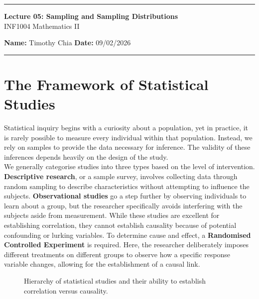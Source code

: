 \documentclass[12pt]{scrartcl}
\begin{document}
\begin{center}
	\hrule
	\vspace{0.4cm}
	{\textbf{\large Lecture 05: Sampling and Sampling Distributions}} \\ [0.2cm]
	INF1004 Mathematics II

\end{center}

\textbf{Name:} Timothy Chia \hspace{\fill} \textbf{Date:}  09/02/2026\\

\hrule

\section{The Framework of Statistical Studies}
Statistical inquiry begins with a curiosity about a population, yet in practice, it is rarely possible to measure every individual within that population. Instead, we rely on samples to provide the data necessary for inference. The validity of these inferences depends heavily on the design of the study. \\

We generally categorise studies into three types based on the level of intervention. \textbf{Descriptive research}, or a sample survey, involves collecting data through random sampling to describe characteristics without attempting to influence the subjects. \textbf{Observational studies} go a step further by observing individuals to learn about a group, but the researcher specifically avoids interfering with the subjects aside from measurement. While these studies are excellent for establishing correlation, they cannot establish causality because of potential confounding or lurking variables. To determine cause and effect, a \textbf{Randomised Controlled Experiment} is required. Here, the researcher deliberately imposes different treatments on different groups to observe how a specific response variable changes, allowing for the establishment of a causal link.

\begin{figure}[H]
    \centering
    \caption{Hierarchy of statistical studies and their ability to establish correlation versus causality.}
\end{figure}
\end{document}
